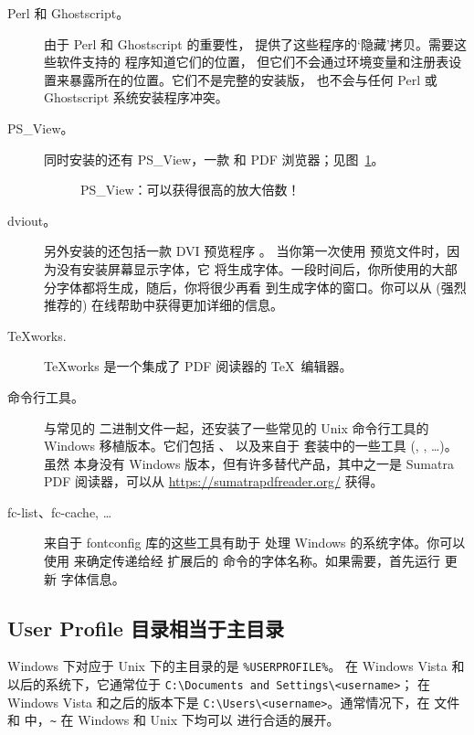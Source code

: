 \documentclass{article}
\begin{document}
\begin{description}
\item[Perl 和 Ghostscript。] 由于 Perl 和  Ghostscript 的重要性，\TL{}
提供了这些程序的`隐藏'拷贝。需要这些软件支持的 \TL{} 程序知道它们的位置，
但它们不会通过环境变量和注册表设置来暴露所在的位置。它们不是完整的安装版，
也不会与任何 Perl 或 Ghostscript 系统安装程序冲突。

\item[PS\_View。] 同时安装的还有 PS\_View，一款 \PS{} 和 PDF
浏览器；见图~\ref{fig:psview}。

\begin{figure}[tb]
\caption{PS\_View：可以获得很高的放大倍数！}\label{fig:psview}
\end{figure}

\item[dviout。] 另外安装的还包括一款 DVI 预览程序 。
当你第一次使用  预览文件时，因为没有安装屏幕显示字体，它
将生成字体。一段时间后，你所使用的大部分字体都将生成，随后，你将很少再看
到生成字体的窗口。你可以从 (强烈推荐的) 在线帮助中获得更加详细的信息。

\item[\TeX{}works.]  \TeX{}works 是一个集成了 PDF 阅读器的
  \TeX\ 编辑器。

\item[命令行工具。] 与常见的 \TL{} 二进制文件一起，还安装了一些常见的
Unix 命令行工具的 Windows 移植版本。它们包括 、
 以及来自于  套装中的一些工具
(, , \ldots)。
虽然  本身没有 Windows 版本，但有许多替代产品，其中之一是
Sumatra PDF 阅读器，可以从 \url{https://sumatrapdfreader.org/} 获得。

\item[fc-list、fc-cache, \ldots] 来自于 fontconfig 库的这些工具有助于 \XeTeX{}
处理 Windows 的系统字体。你可以使用  来确定传递给经 \XeTeX
扩展后的  命令的字体名称。如果需要，首先运行  更新
字体信息。
\end{description}


\subsection{User Profile 目录相当于主目录}
\label{sec:winhome}

Windows 下对应于 Unix 下的主目录的是 \verb|%USERPROFILE%|。
在 Windows Vista 和以后的系统下，它通常位于
\verb|C:\Documents and Settings\<username>|；
在 Windows Vista 和之后的版本下是 \verb|C:\Users\<username>|。通常情况下，在
 文件和 \KPS{} 中，\verb|~| 在 Windows 和 Unix 下均可以
进行合适的展开。
\end{document}
